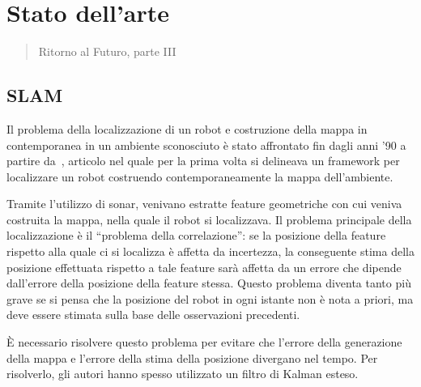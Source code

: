 \chapter{Stato dell'arte}
\label{cap:statoArte}
\thispagestyle{empty}

\begin{quotation}
{\footnotesize
{}
\begin{flushright}
Ritorno al Futuro, parte III
\end{flushright}
}
\end{quotation}
\vspace{0.5cm}

\section{SLAM}

Il problema della localizzazione di un robot e costruzione della mappa in contemporanea in un ambiente sconosciuto è stato affrontato fin dagli anni '90 a partire da~\cite{174711}, articolo nel quale per la prima volta si delineava un framework per localizzare un robot costruendo contemporaneamente la mappa dell'ambiente.

Tramite l'utilizzo di sonar, venivano estratte feature geometriche con cui veniva costruita la mappa, nella quale il robot si localizzava. 
Il problema principale della localizzazione è il ``problema della correlazione'': se la posizione della feature rispetto alla quale ci si localizza è affetta da incertezza, la conseguente stima della posizione effettuata rispetto a tale feature sarà affetta da un errore che dipende dall'errore della posizione della feature stessa. 
Questo problema diventa tanto più grave se si pensa che la posizione del robot in ogni istante non è nota a priori, ma deve essere stimata sulla base delle osservazioni precedenti. 

\`E necessario risolvere questo problema per evitare che l'errore della generazione della mappa e l'errore della stima della posizione divergano nel tempo. 
Per risolverlo, gli autori hanno spesso utilizzato un filtro di Kalman esteso.

